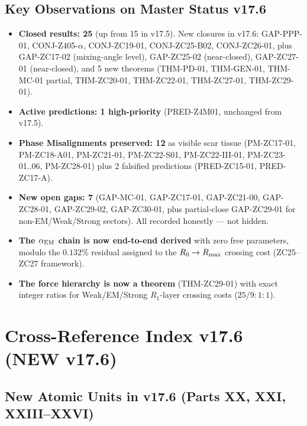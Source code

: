 \documentclass[12pt, a4paper]{article}
\begin{document}
\subsection{Key Observations on Master Status v17.6}

\begin{itemize}[leftmargin=*]
\item \textbf{Closed results: 25} (up from 15 in v17.5). New closures
in v17.6: GAP-PPP-01, CONJ-Z405-$\alpha$, CONJ-ZC19-01, CONJ-ZC25-B02,
CONJ-ZC26-01, plus GAP-ZC17-02 (mixing-angle level), GAP-ZC25-02
(near-closed), GAP-ZC27-01 (near-closed), and 5 new theorems
(THM-PD-01, THM-GEN-01, THM-MC-01 partial, THM-ZC20-01, THM-ZC22-01,
THM-ZC27-01, THM-ZC29-01).

\item \textbf{Active predictions: 1 high-priority} (PRED-Z4M01,
unchanged from v17.5).

\item \textbf{Phase Misalignments preserved: 12} as visible scar
tissue (PM-ZC17-01, PM-ZC18-A01, PM-ZC21-01, PM-ZC22-S01,
PM-ZC22-III-01, PM-ZC23-01..06, PM-ZC28-01) plus 2 falsified
predictions (PRED-ZC15-01, PRED-ZC17-A).

\item \textbf{New open gaps: 7} (GAP-MC-01, GAP-ZC17-01, GAP-ZC21-00,
GAP-ZC28-01, GAP-ZC29-02, GAP-ZC30-01, plus partial-close GAP-ZC29-01
for non-EM/Weak/Strong sectors). All recorded honestly --- not hidden.

\item \textbf{The $\alpha_{\rm EM}$ chain is now end-to-end derived}
with zero free parameters, modulo the $0.132\%$ residual assigned to
the $R_0 \to R_{\rm max}$ crossing cost (ZC25--ZC27 framework).

\item \textbf{The force hierarchy is now a theorem} (THM-ZC29-01)
with exact integer ratios for Weak/EM/Strong $R_1$-layer crossing
costs ($25/9 : 1 : 1$).
\end{itemize}

\section{Cross-Reference Index v17.6 (NEW v17.6)}
\label{sec:cross-ref-index-v176}

\subsection{New Atomic Units in v17.6 (Parts XX, XXI, XXIII--XXVI)}
\end{document}
